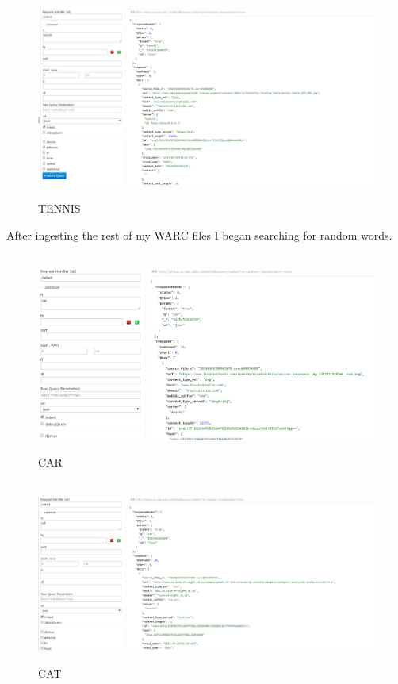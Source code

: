 \documentclass[12pt]{article}
\begin{document}
\begin{figure}[H]
    \caption{TENNIS}
    \centering
    \includegraphics[scale=0.5]{tennis.PNG}
\end{figure}

After ingesting the rest of my WARC files I began searching for random words.

\begin{figure}[H]
    \caption{CAR}
    \centering
    \includegraphics[scale=0.5]{car.PNG}
\end{figure}

\begin{figure}[H]
    \caption{CAT}
    \centering
    \includegraphics[scale=0.5]{catquery.PNG}
\end{figure}
\end{document}

